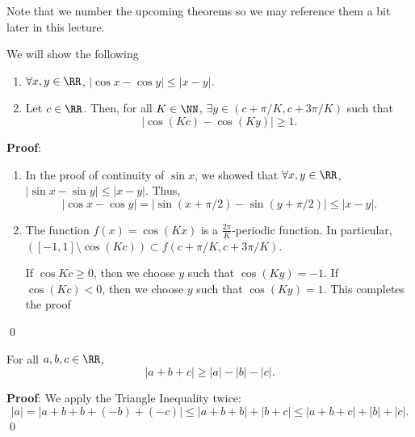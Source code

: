 \begin{remark}
Note that we number the upcoming theorems so we may reference them a bit later in this lecture.
\end{remark}
\begin{theorem}[Theorem I]
We will show the following
\begin{enumerate}
    \item $\forall x,y\in \RR$, $|\cos x - \cos y| \leq |x-y|$.
    \item Let $c\in \RR$. Then, for all $K\in \NN$, $\exists y\in (c+\pi /K, c+3\pi/K)$ such that 
    \[
    |\cos(Kc) - \cos(Ky)| \geq 1.
    \]
\end{enumerate}
\end{theorem}
\textbf{Proof}: 
\begin{enumerate}
    \item In the proof of continuity of $\sin x$, we showed that $\forall x,y\in \RR$, $|\sin x - \sin y| \leq |x-y|$. Thus, 
    \[
    |\cos x - \cos y| = |\sin(x+\pi/2) -\sin(y+\pi/2)| \leq |x-y|.
    \]
    \item The function $f(x) = \cos(Kx)$ is a $\frac{2\pi}{K}$-periodic function. In particular, $([-1,1] \setminus \cos(Kc)) \subset f(c+\pi/K, c+3\pi/K)$.
    
    If $\cos Kc\geq 0$, then we choose $y$ such that $\cos(Ky) = -1$. If $\cos (Kc)< 0$, then we choose $y$ such that $\cos(Ky) = 1$. This completes the proof
\end{enumerate} \qed 

\begin{theorem}[Theorem II]
For all $a,b,c\in \RR$,
\[
|a+b+c|\geq |a|-|b|-|c|.
\]
\end{theorem}
\textbf{Proof}: We apply the Triangle Inequality twice:
\[
|a| = |a+b+b+(-b)+(-c)| \leq |a+b+b| + |b+c| \leq |a+b+c| + |b|+|c|.
\] \qed 

